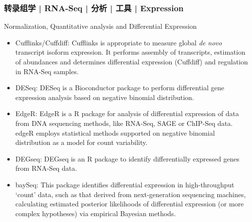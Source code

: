 \begin{frame}
  \frametitle{转录组学 | RNA-Seq | 分析 | 工具 | Expression}
  {\footnotesize
  \begin{block}{Normalization, Quantitative analysis and Differential Expression}
    \begin{itemize}
      \item Cufflinks/Cuffdiff: Cufflinks is appropriate to measure global \textit{de novo} transcript isoform expression. It performs assembly of transcripts, estimation of abundances and determines differential expression (Cuffdiff) and regulation in RNA-Seq samples.
      \item DESeq: DESeq is a Bioconductor package to perform differential gene expression analysis based on negative binomial distribution.
      \item EdgeR: EdgeR is a R package for analysis of differential expression of data from DNA sequencing methods, like RNA-Seq, SAGE or ChIP-Seq data. edgeR employs statistical methods supported on negative binomial distribution as a model for count variability.
      \item DEGseq: DEGseq is an R package to identify differentially expressed genes from RNA-Seq data.
      \item baySeq: This package identifies differential expression in high-throughput `count' data, such as that derived from next-generation sequencing machines, calculating estimated posterior likelihoods of differential expression (or more complex hypotheses) via empirical Bayesian methods.
    \end{itemize}
  \end{block}
}
\end{frame}

